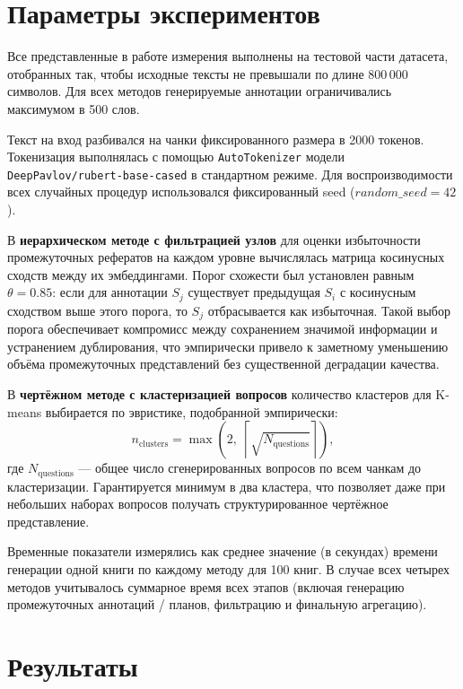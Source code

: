\documentclass{article}
\begin{document}
\section*{Параметры экспериментов}

Все представленные в работе измерения выполнены на тестовой части датасета, 
отобранных так, чтобы исходные тексты не превышали по длине 800\,000 символов. 
Для всех методов генерируемые аннотации ограничивались максимумом в 500 слов.

Текст на вход разбивался на чанки фиксированного размера в 2000 токенов. 
Токенизация выполнялась с помощью \texttt{AutoTokenizer} модели \texttt{DeepPavlov/rubert-base-cased} в стандартном режиме.
Для воспроизводимости всех случайных процедур использовался фиксированный seed ($random\_seed = 42$).

В \textbf{иерархическом методе с фильтрацией узлов} для оценки избыточности промежуточных рефератов на каждом уровне вычислялась матрица косинусных сходств между их эмбеддингами.
Порог схожести был установлен равным $\theta=0.85$: если для аннотации $S_j$ существует предыдущая $S_i$ с косинусным сходством выше этого порога, 
то $S_j$ отбрасывается как избыточная. Такой выбор порога обеспечивает компромисс между сохранением значимой информации и устранением дублирования, 
что эмпирически привело к заметному уменьшению объёма промежуточных представлений без существенной деградации качества.

В \textbf{чертёжном методе с кластеризацией вопросов} количество кластеров для K-means выбирается по эвристике, подобранной эмпирически:
\[
n_{\text{clusters}} = \max\!\left(2,\; \left\lceil \sqrt{N_{\text{questions}}} \right\rceil\right),
\]
где $N_{\text{questions}}$ — общее число сгенерированных вопросов по всем чанкам до кластеризации. 
Гарантируется минимум в два кластера, что позволяет даже при небольших наборах вопросов получать структурированное чертёжное представление.

Временные показатели измерялись как среднее значение (в секундах) времени генерации одной книги по каждому методу для 100 книг. 
В случае всех четырех методов учитывалось суммарное время всех этапов (включая генерацию промежуточных аннотаций / планов, фильтрацию и финальную агрегацию).


\section*{Результаты}
\end{document}
